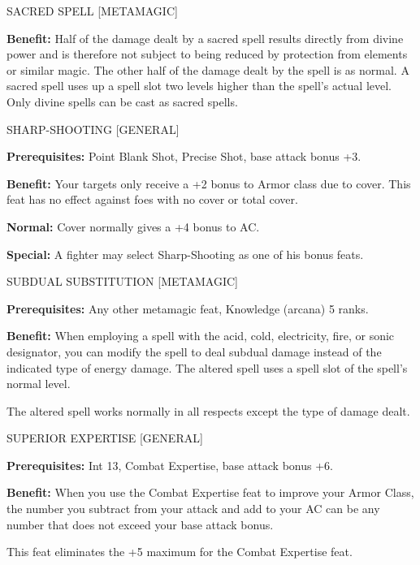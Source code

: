 \documentclass{article}
\begin{document}
\vspace{12pt}
SACRED SPELL [METAMAGIC]

\textbf{Benefit:} Half of the damage dealt by a sacred spell results directly from 
divine power and is therefore not subject to being reduced by protection from elements 
or similar magic. The other half of the damage dealt by the spell is as normal. 
A sacred spell uses up a spell slot two levels higher than the spell's actual level. 
Only divine spells can be cast as sacred spells.

\vspace{12pt}
SHARP-SHOOTING [GENERAL]

\textbf{Prerequisites:} Point Blank Shot, Precise Shot, base attack bonus +3.

\textbf{Benefit:} Your targets only receive a +2 bonus to Armor class due to cover. 
 This feat has no effect against foes with no cover or total cover.

\textbf{Normal:} Cover normally gives a +4 bonus to AC.

\textbf{Special:} A fighter may select Sharp-Shooting as one of his bonus feats.

\vspace{12pt}
SUBDUAL SUBSTITUTION [METAMAGIC]

\textbf{Prerequisites:} Any other metamagic feat, Knowledge (arcana) 5 ranks.

\textbf{Benefit:} When employing a spell with the acid, cold, electricity, fire, 
or sonic designator, you can modify the spell to deal subdual damage instead of 
the indicated type of energy damage. The altered spell uses a spell slot of the 
spell's normal level.

The altered spell works normally in all respects except the type of damage dealt. 

\vspace{12pt}
SUPERIOR EXPERTISE [GENERAL]

\textbf{Prerequisites:} Int 13, Combat Expertise, base attack bonus +6.

\textbf{Benefit:} When you use the Combat Expertise feat to improve your Armor 
Class, the number you subtract from your attack and add to your AC can be any number 
that does not exceed your base attack bonus.

This feat eliminates the +5 maximum for the Combat Expertise feat. 

\newpage
\end{document}
